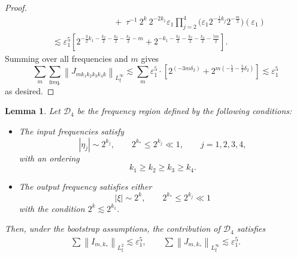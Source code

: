 \documentclass[reqno,english,11pt]{amsart}
\newcommand{\eps}{\varepsilon}
\newcommand{\snorm}[1]{\left\|#1\right\|}
\newtheorem{lemma}[theorem]{Lemma}
\theoremstyle{definition}
\numberwithin{equation}{section}
\begin{document}
\begin{proof}
\begin{align*}
    &\quad \quad \quad \quad \quad  \quad \quad \;+ \;\tau^{-1}\ 2^k\ 2^{-2k_1}\eps_1 \prod^4_{j=2} \bigl(\eps_1 2^{-\frac{1}{2}k_j}2^{-\frac{m}{2}}\bigr)\left(\eps_1\right)\\
    &\lesssim \eps_1^5\left[2^{-\frac{3}{2}k_1-\frac{k_2}{2}-\frac{k_3}{2}-\frac{k_4}{2}-m}+2^{-k_1-\frac{k_2}{2}-\frac{k_3}{2}-\frac{k_4}{2}-\frac{5m}{2}}\right].
\end{align*}
Summing over all frequencies and $m$ gives
$$\sum_{m}\sum_{\operatorname{freq.}}\snorm{J_{mk_1k_2k_3k_4k}}_{L^\infty_\xi}\lesssim \sum_{m}\eps_1^5\cdot\left[2^{(-3m\delta_2)}+2^{m(-\frac{5}{3}-\frac{5}{2}\delta_2)}\right]\lesssim \eps_1^5$$as desired. 
\end{proof}
\begin{lemma}\label{prop:deg_case_4}
Let $\mathcal{D}_4$ be the frequency region defined by the following conditions:
\begin{itemize}
    \item The input frequencies satisfy
    $$ |\eta_j| \sim 2^{k_j}, \qquad 2^{k_*} \le 2^{k_j} \ll 1, \qquad j=1,2,3,4,$$
    with an ordering
    $$  k_1 \ge k_2 \ge k_3 \ge k_4.$$
    \item The output frequency satisfies either
    $$  |\xi| \sim 2^k, \qquad 2^{k_*} \le 2^{k_j} \ll 1$$
    with the condition $2^k \lesssim 2^{k_1}$.
\end{itemize}
Then, under the bootstrap assumptions, the contribution of $\mathcal{D}_4$ satisfies
    \begin{align*}
    \sum\snorm{I_{m,k_*}}_{L^2_\xi}\lesssim \eps_1^5,\qquad\sum\snorm{J_{m,k_*}}_{L^\infty_\xi}\lesssim \eps_1^5.
    \end{align*}
\end{lemma}
\end{document}
